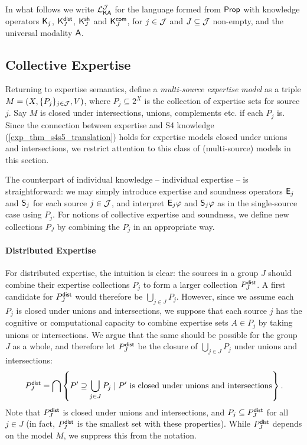 In what follows we write $\cLKAJ$ for the language formed from $\Prop$ with
knowledge operators $\K_j$, $\Kdist_J$, $\Kshared_J$ and $\Kcommon_J$, for $j
\in \J$ and $J \subseteq \J$ non-empty, and the universal modality $\A$.

\subsection{Collective Expertise}

Returning to expertise semantics, define a \emph{multi-source expertise model}
as a triple $M = (X, \{P_j\}_{j \in \J}, V)$, where $P_j \subseteq 2^X$ is the
collection of expertise sets for source $j$. Say $M$ is closed under
intersections, unions, complements etc. if each $P_j$ is. Since the connection
between expertise and S4 knowledge (\cref{exp_thm_s4s5_translation}) holds for
expertise models closed under unions and intersections, we restrict
attention to this class of (multi-source) models in this section.

The counterpart of individual knowledge -- individual expertise -- is
straightforward: we may simply introduce expertise and soundness operators
$\E_j$ and $\S_j$ for each source $j \in \J$, and interpret
$\E_j\phi$ and $\S_j\phi$ as in the single-source case using
$P_j$. For notions of collective expertise and soundness, we define new
collections $P_J$ by combining the $P_j$ in an appropriate way.

\paragraph{Distributed Expertise}

For distributed expertise, the intuition is clear: the sources in a group
$J$ should combine their expertise collections $P_j$ to form a
larger collection $\Pdist_J$. A first candidate for $\Pdist_J$
would therefore be $\bigcup_{j \in J}{P_j}$. However, since we assume
each $P_j$ is closed under unions and intersections, we suppose that each
source $j$ has the cognitive or computational capacity to combine expertise
sets $A \in P_j$ by taking unions or intersections. We argue that the
same should be possible for the group $J$ as a whole, and therefore let
$\Pdist_J$ be the closure of $\bigcup_{j \in J}{P_j}$ under unions
and intersections:
\[
\Pdist_J
= \bigcap\left\{
 P' \supseteq \bigcup_{j \in J}{P_j}
 \mid
 P' \text{ is closed under unions and intersections}
\right\}.\]
Note that $\Pdist_J$ is closed under unions and intersections, and
$P_j \subseteq \Pdist_J$ for all $j \in J$ (in fact,
$\Pdist_J$ is the smallest set with these properties). While
$\Pdist_J$ depends on the model $M$, we suppress this from the
notation.

